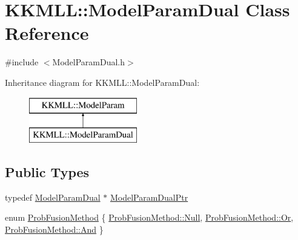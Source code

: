 \hypertarget{class_k_k_m_l_l_1_1_model_param_dual}{}\section{K\+K\+M\+LL\+:\+:Model\+Param\+Dual Class Reference}
\label{class_k_k_m_l_l_1_1_model_param_dual}


{\ttfamily \#include $<$Model\+Param\+Dual.\+h$>$}

Inheritance diagram for K\+K\+M\+LL\+:\+:Model\+Param\+Dual\+:\begin{figure}[H]
\begin{center}
\leavevmode
\includegraphics[height=2.000000cm]{class_k_k_m_l_l_1_1_model_param_dual}
\end{center}
\end{figure}
\subsection*{Public Types}
\begin{DoxyCompactItemize}
\item 
typedef \hyperlink{class_k_k_m_l_l_1_1_model_param_dual}{Model\+Param\+Dual} $\ast$ \hyperlink{class_k_k_m_l_l_1_1_model_param_dual_a83c76ba9be647e769ae21200719f9a23}{Model\+Param\+Dual\+Ptr}
\item 
enum \hyperlink{class_k_k_m_l_l_1_1_model_param_dual_a15565502cd267eb5c34afd4fd08930af}{Prob\+Fusion\+Method} \{ \hyperlink{class_k_k_m_l_l_1_1_model_param_dual_a15565502cd267eb5c34afd4fd08930afabbb93ef26e3c101ff11cdd21cab08a94}{Prob\+Fusion\+Method\+::\+Null}, 
\hyperlink{class_k_k_m_l_l_1_1_model_param_dual_a15565502cd267eb5c34afd4fd08930afa3a2d5fe857d8f9541136a124c2edec6c}{Prob\+Fusion\+Method\+::\+Or}, 
\hyperlink{class_k_k_m_l_l_1_1_model_param_dual_a15565502cd267eb5c34afd4fd08930afac33315685a0cba3ce53be378b3c7874b}{Prob\+Fusion\+Method\+::\+And}
 \}
\end{DoxyCompactItemize}
